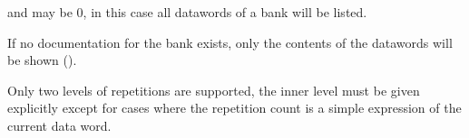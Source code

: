 \newpage

{\samepage \clearpage \begin{Notes}\item {} and  may be 0, in this case all datawords
      of a bank will be listed. 
\item If no documentation for the bank exists, only the contents of the 
      datawords will be shown ().
\item Only two levels of repetitions are supported, the inner level
      must be given explicitly except for cases where the repetition count
      is a simple expression of the current data word.
\end{Notes}
}



